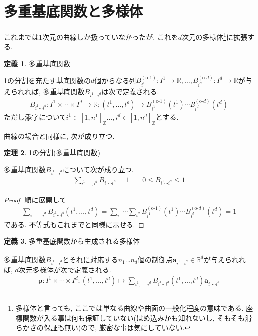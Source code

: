 \documentclass{jsarticle}
\newcommand\setR{\mathbb{R}}
\newcommand\squa[1]{[#1]}
\newcommand\Z[2]{\squa{#1,#2}_\mathbb{Z}}
\theoremstyle{definition}%
\newtheorem{thm}{定理}
\newtheorem{defn}[thm]{定義}
\begin{document}
\section{多重基底関数と多様体}
これまでは$1$次元の曲線しか扱っていなかったが, これを$d$次元の多様体\footnote{
多様体と言っても, ここでは単なる曲線や曲面の一般化程度の意味である. 座標関数が入る事は何も保証していない(はめ込みかも知れないし, そもそも滑らかさの保証も無い)ので, 厳密な事は気にしていない.
}に拡張する.
\begin{screen}
	\begin{defn}
        多重基底関数

        1の分割を充たす基底関数の$d$個からなる列$B_{i^1}^{(\text{o-}1)}:I^1\to \setR,\dots,B_{i^d}^{(\text{o-}d)}:I^d\to \setR$が与えられれば, 多重基底関数$B_{i^1\cdots i^d}$は次で定義される.
		\begin{align}
            B_{i^1\cdots i^d}:I^1\times \cdots\times I^d\to \setR;(t^1,\dots,t^d)\mapsto B_{i^1}^{(\text{o-}1)}(t^1)\cdots B_{i^d}^{(\text{o-}d)}(t^d)
		\end{align}
        ただし添字について$i^1\in\Z{1}{n^1}\dots,i^d\in\Z{1}{n^d}$とする.\footnotemark
	\end{defn}
\end{screen}
曲線の場合と同様に, 次が成り立つ.
\begin{screen}
	\begin{thm}
		1の分割(多重基底関数)

        多重基底関数$B_{i^1\cdots i^d}$について次が成り立つ.
		\begin{align}
			\sum_{i^1,\dots,i^d} B_{i^1\cdots i^d}= 1 \qquad
            0\le B_{i^1\cdots i^d}\le 1
		\end{align}
	\end{thm}
\end{screen}
\begin{proof}
	順に展開して
	\begin{align}
        \sum_{i^1,\dots,i^d} B_{i^1\cdots i^d}(t^1,\dots,t^d)
        =\sum_{i^1}\cdots\sum_{i^d} B_{i^1}^{(\text{o-}1)}(t^1)\cdots B_{i^d}^{(\text{o-}d)}(t^d)
        = 1
	\end{align}
	である.
    不等式もこれまでと同様に示せる.
\end{proof}
\begin{screen}
	\begin{defn}
        多重基底関数から生成される多様体

        多重基底関数$B_{i^1\cdots i^d}$とそれに対応する$n_1\dots n_d$個の制御点$\bm{a}_{i^1\cdots i^d}\in \setR^{\tilde{d}}$が与えられれば, $d$次元多様体が次で定義される.
		\begin{align}
            \bm{p}:I^1\times\cdots\times I^d;(t^1,\dots,t^d)\mapsto\sum_{i^1,\dots,i^d} B_{i^1\cdots i^d}(t^1,\dots,t^d)\bm{a}_{i^1\cdots i^d}
		\end{align}
	\end{defn}
\end{screen}
\end{document}
